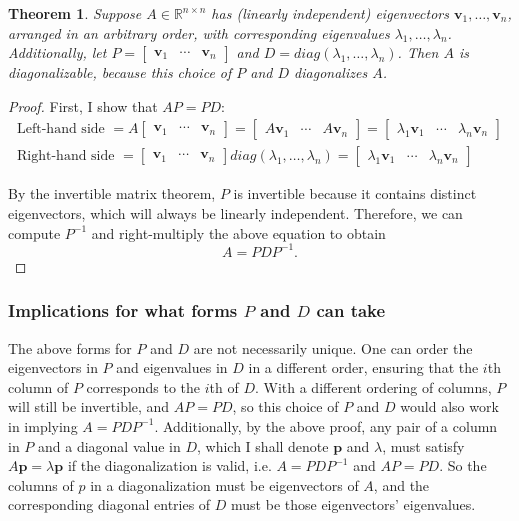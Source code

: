 \documentclass[draft,12pt]{report}
\newtheorem{theorem}{Theorem}
\renewcommand{\vec}[1]{\mathbf{#1}}
\begin{document}
\begin{theorem}
    Suppose $A \in \mathbb R^{n \times n}$ has (linearly independent) eigenvectors $\vec{v}_1, \ldots, \vec{v}_n$, arranged in an arbitrary order, with corresponding eigenvalues $\lambda_1, \ldots, \lambda_n$. Additionally, let $P = \begin{bmatrix} \vec{v}_1 & \cdots & \vec{v}_n \end{bmatrix}$ and $D = diag(\lambda_1, \ldots, \lambda_n)$. Then $A$ is diagonalizable, because this choice of $P$ and $D$ diagonalizes $A$.
\end{theorem}
\begin{proof}
    First, I show that $AP = PD$:
    \begin{gather*}
        \text{Left-hand side } = A\begin{bmatrix} \vec{v}_1 & \cdots & \vec{v}_n \end{bmatrix} = \begin{bmatrix} A\vec{v}_1 & \cdots & A\vec{v}_n \end{bmatrix} = \begin{bmatrix} \lambda_1\vec{v}_1 & \cdots & \lambda_n\vec{v}_n \end{bmatrix} \\
        \text{Right-hand side } = \begin{bmatrix} \vec{v}_1 & \cdots & \vec{v}_n \end{bmatrix} diag(\lambda_1, \ldots, \lambda_n) = \begin{bmatrix} \lambda_1\vec{v}_1 & \cdots & \lambda_n\vec{v}_n \end{bmatrix}
    \end{gather*}
    
    By the invertible matrix theorem, $P$ is invertible because it contains distinct eigenvectors, which will always be linearly independent. Therefore, we can compute $P^{-1}$ and right-multiply the above equation to obtain
    \[ A = PDP^{-1}. \]
\end{proof}

\subsubsection{Implications for what forms $P$ and $D$ can take}

The above forms for $P$ and $D$ are not necessarily unique. One can order the eigenvectors in $P$ and eigenvalues in $D$ in a different order, ensuring that the $i$th column of $P$ corresponds to the $i$th of $D$. With a different ordering of columns, $P$ will still be invertible, and $AP = PD$, so this choice of $P$ and $D$ would also work in implying $A = PDP^{-1}$. Additionally, by the above proof, any pair of a column in $P$ and a diagonal value in $D$, which I shall denote $\vec{p}$ and $\lambda$, must satisfy $A\vec{p} = \lambda\vec{p}$ if the diagonalization is valid, i.e. $A = PDP^{-1}$ and $AP = PD$. So the columns of $p$ in a diagonalization must be eigenvectors of $A$, and the corresponding diagonal entries of $D$ must be those eigenvectors' eigenvalues.
\end{document}
